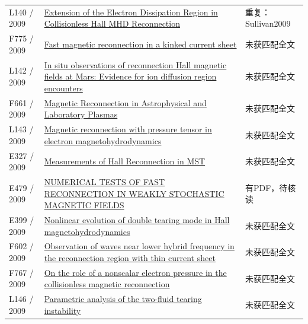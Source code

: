 \begin{longtable}{P{24mm}P{97mm}P{27mm}}
L140 / 2009 & \href{https://doi.org/10.48550/arxiv.0905.4765}{Extension of the Electron Dissipation Region in Collisionless Hall MHD Reconnection} & 重复：Sullivan2009\\

F775 / 2009 & \href{https://doi.org/10.1063/1.3106685}{Fast magnetic reconnection in a kinked current sheet} & 未获匹配全文\\

L142 / 2009 & \href{https://doi.org/10.1029/2009ja014544}{In situ observations of reconnection Hall magnetic fields at Mars: Evidence for ion diffusion region encounters} & 未获匹配全文\\

F661 / 2009 & \href{https://doi.org/10.1146/annurev-astro-082708-101726}{Magnetic Reconnection in Astrophysical and Laboratory Plasmas} & 未获匹配全文\\

L143 / 2009 & \href{https://doi.org/10.1063/1.3122050}{Magnetic reconnection with pressure tensor in electron magnetohydrodynamics} & 未获匹配全文\\

E327 / 2009 & \href{http://absimage.aps.org/image/DPP09/MWS_DPP09-2009-020006.pdf}{Measurements of Hall Reconnection in MST} & 未获匹配全文\\

E479 / 2009 & \href{https://doi.org/10.1088/0004-637x/700/1/63}{NUMERICAL TESTS OF FAST RECONNECTION IN WEAKLY STOCHASTIC MAGNETIC FIELDS} & 有PDF，待核读\\

E399 / 2009 & \href{https://doi.org/10.1063/1.3276534}{Nonlinear evolution of double tearing mode in Hall magnetohydrodynamics} & 未获匹配全文\\

F602 / 2009 & \href{https://doi.org/10.1029/2008ja013427}{Observation of waves near lower hybrid frequency in the reconnection region with thin current sheet} & 未获匹配全文\\

F767 / 2009 & \href{https://doi.org/10.1063/1.3266419}{On the role of a nonscalar electron pressure in the collisionless magnetic reconnection} & 未获匹配全文\\

L146 / 2009 & \href{https://doi.org/10.1088/0741-3335/51/5/055018}{Parametric analysis of the two-fluid tearing instability} & 未获匹配全文\\


\end{longtable}
